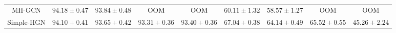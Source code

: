 \begin{table*}[!t]
{\begin{tabular}{c|cc|cc|cc|cc}
  MH-GCN    & $94.18 \pm 0.47$    
            & $93.84 \pm 0.48$    
            & OOM
		  & OOM
            & $60.11 \pm 1.32$  
            & $58.57 \pm 1.27$
            & OOM
            & OOM
		\\
    Simple-HGN
            & $94.10 \pm 0.41$    
            & $93.65 \pm 0.42$    
            & $93.31 \pm 0.36$
		    & $93.40 \pm 0.36$                
            & $67.04 \pm 0.38$  
            & $64.14 \pm 0.49$
            & $\underline{65.52 \pm 0.55}$
            & $45.26 \pm 2.24$


\end{tabular}}
\end{table*}

